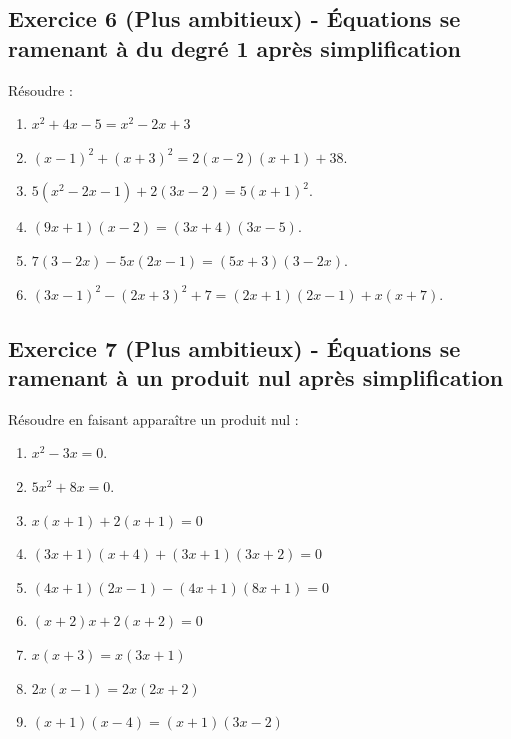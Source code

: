 \documentclass[14 pt]{extarticle}
\renewcommand\it\item
\theoremstyle{plain}
\begin{document}
  \subsection*{Exercice 6 (Plus ambitieux) - Équations se ramenant à du degré 1 après simplification}
  Résoudre :\begin{enumerate}
  \it $x^2+ 4x - 5 = x^2 - 2x + 3$
\it $(x-1)^2+(x+3)^2= 2(x-2)(x+1)+38$.
\it $5(x^2-2x-1)+2(3x-2)=5(x+1)^2$.
\it $(9x+1)(x-2)=(3x+4)(3x-5)$.
\it $7(3-2x)-5x(2x-1)=(5x+3)(3-2x)$. 
\it $(3x-1)^2-(2x+3)^2+7 = (2x+1)(2x-1) + x(x+7)$.
  \end{enumerate}
 
  \subsection*{Exercice 7 (Plus ambitieux) - Équations se ramenant à un produit nul après simplification}
  Résoudre en faisant apparaître un produit nul : 
  \begin{enumerate}
\it $x^2-3x=0$. 
\it $5x^2+8x=0$. 
\it $x(x+1) + 2(x+1) = 0$
\it $(3x+1)(x+4) + (3x+1)(3x+2) =0$
\it $(4x+1)(2x-1)-(4x+1)(8x+1)=0$
\it $(x+2)x +2(x+2)=0$
\it $x(x+3) = x(3x+1)$
\it $2x(x-1) = 2x(2x+2)$
\it $(x+1)(x-4) = (x+1)(3x-2)$

  \end{enumerate}
  
  
  
  
  
  
 	
\end{document}
